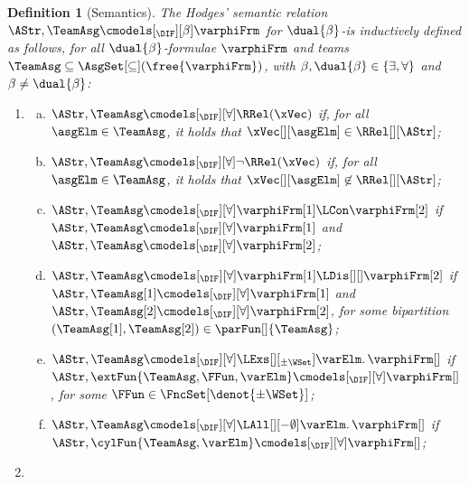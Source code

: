 \documentclass[authoryear]{elsarticle}
\newtheorem{definition}{Definition}
\begin{document}
\begin{definition}[\DIF Semantics]
  \label{def:sem(dif)}
  The \emph{Hodges' semantic relation} $\AStr, \TeamAsg \cmodels[_{\DIF}][\beta]
  \varphiFrm$ for $\dual{\beta}$-\DIF is inductively defined as follows, for
  all $\dual{\beta}$-\DIF formulae $\varphiFrm$ and teams $\TeamAsg \subseteq
  \AsgSet[\subseteq]( \free{\varphiFrm})$, with $\beta, \dual{\beta} \in \{
  \exists, \forall \}$ and $\beta \neq \dual{\beta}$:
  \begin{enumerate}[1)]
  \item\label{def:sem(dif:a)}
    \begin{enumerate}[a)]
    \item\label{def:sem(dif:rel:a)}
      $\AStr, \TeamAsg \cmodels[_{\DIF}][\forall] \RRel(\xVec)$ if, for all
      $\asgElm \in \TeamAsg$, it holds that $\xVec[][\asgElm] \in
      \RRel[][\AStr]$;
    \item\label{def:sem(dif:neg:a)}
      $\AStr, \TeamAsg \cmodels[_{\DIF}][\forall] \neg \RRel(\xVec)$ if, for
      all $\asgElm \in \TeamAsg$, it holds that $\xVec[][\asgElm]
      \not\in \RRel[][\AStr]$;
    \item\label{def:sem(dif:con:a)}
      $\AStr, \TeamAsg \cmodels[_{\DIF}][\forall] \varphiFrm[1] \LCon
      \varphiFrm[2]$ if $\AStr, \TeamAsg \cmodels[_{\DIF}][\forall]
      \varphiFrm[1]$ and $\AStr, \TeamAsg \cmodels[_{\DIF}][\forall]
      \varphiFrm[2]$;
    \item\label{def:sem(dif:dis:a)}
      $\AStr, \TeamAsg \cmodels[_{\DIF}][\forall] \varphiFrm[1] \LDis[][]
      \varphiFrm[2]$ if $\AStr, \TeamAsg[1] \cmodels[_{\DIF}][\forall]
      \varphiFrm[1]$ and $\AStr, \TeamAsg[2] \cmodels[_{\DIF}][\forall]
      \varphiFrm[2]$, for some bipartition $(\TeamAsg[1], \TeamAsg[2]) \in
      \parFun[]{\TeamAsg}$;
    \item\label{def:sem(dif:exs:a)}
      $\AStr, \TeamAsg \cmodels[_{\DIF}][\forall] \LExs[][_{\pm\WSet}] \varElm
      \ldotp \varphiFrm[]$ if $\AStr, \extFun{\TeamAsg, \FFun, \varElm}
      \cmodels[_{\DIF}][\forall] \varphiFrm[]$, for some $\FFun \in
      \FncSet[\denot{\pm\WSet}]{}$;
    \item\label{def:sem(dif:all:a)}
      $\AStr, \TeamAsg \cmodels[_{\DIF}][\forall] \LAll[][-\emptyset] \varElm
      \ldotp \varphiFrm[]$ if $\AStr, \cylFun{\TeamAsg, \varElm}
      \cmodels[_{\DIF}][\forall] \varphiFrm[]$;
    \end{enumerate}
  \item\label{def:sem(dif:e)}
    \begin{enumerate}[a)]

\end{enumerate}
\end{enumerate}
\end{definition}
\end{document}
